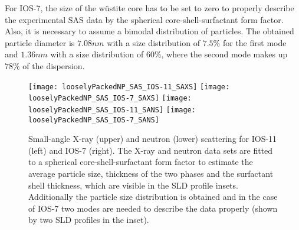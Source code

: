 \documentclass[\main/dresen_thesis.tex]{subfiles}
\begin{document}
    For IOS-7, the size of the w\"ustite core has to be set to zero to properly describe the experimental SAS data by the spherical core-shell-surfactant form factor.
    Also, it is necessary to assume a bimodal distribution of particles.
    The obtained particle diameter is $7.08 \unit{nm}$ with a size distribution of $7.5 \unit{\%}$ for the first mode and $1.36 \unit{nm}$ with a size distribution of $60 \unit{\%}$, where the second mode makes up $78 \unit{\%}$ of the dispersion.

    \begin{figure}[!htbp]
      \centering
      \texttt{[image: looselyPackedNP\_SAS\_IOS-11\_SAXS]}
      \texttt{[image: looselyPackedNP\_SAS\_IOS-7\_SAXS]}
      \texttt{[image: looselyPackedNP\_SAS\_IOS-11\_SANS]}
      \texttt{[image: looselyPackedNP\_SAS\_IOS-7\_SANS]}
      \caption{\label{fig:looselyPackedNP:nanoparticle:sas}Small-angle X-ray (upper) and neutron (lower) scattering for IOS-11 (left) and IOS-7 (right). The X-ray and neutron data sets are fitted to a spherical core-shell-surfactant form factor to estimate the average particle size, thickness of the two phases and the surfactant shell thickness, which are visible in the SLD profile insets. Additionally the particle size distribution is obtained and in the case of IOS-7 two modes are needed to describe the data properly (shown by two SLD profiles in the inset).}
    \end{figure}
\end{document}
